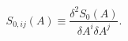 \begin{equation*}
S_{0,ij}(A)\equiv \frac{\delta ^{2}S_{0}(A)}{\delta A^{i}\delta A^{j}}.
\end{equation*}

